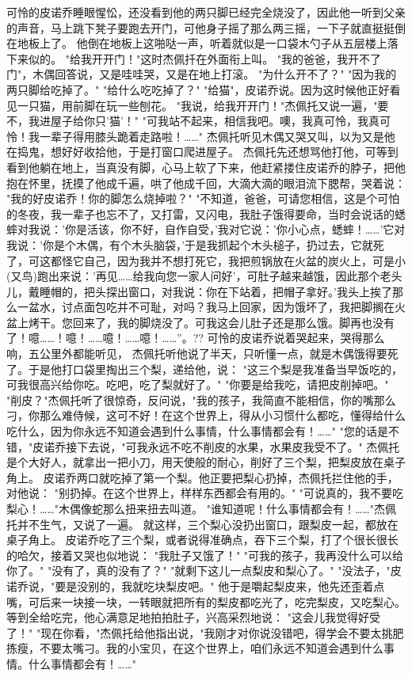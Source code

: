 \documentclass[12pt,UTF8]{ctexbook}
\begin{document}
可怜的皮诺乔睡眼惺忪，还没看到他的两只脚已经完全烧没了，因此他一听到父亲的声音，马上跳下凳子要跑去开门，可他身子摇了那么两三摇，一下子就直挺挺倒在地板上了。
他倒在地板上这啪哒一声，听着就似是一口袋木勺子从五层楼上落下来似的。
"给我开开门！"这时杰佩扦在外面衔上叫。
"我的爸爸，我开不了门"，木偶回答说，又是哇哇哭，又是在地上打滚。
"为什么开不了？"
"因为我的两只脚给吃掉了。"
"给什么吃吃掉了？"
"给猫"，皮诺乔说。因为这时候他正好看见一只猫，用前脚在玩一些刨花。
"我说，给我开开门！"杰佩托又说一遍，"要不，我进屋子给你只'猫'！"
"可我站不起来，相信我吧。噢，我真可怜，我真可怜！我一辈子得用膝头跪着走路啦！……"
杰佩托听见木偶又哭又叫，以为又是他在捣鬼，想好好收拾他，于是打窗口爬进屋子。
杰佩托先还想骂他打他，可等到看到他躺在地上，当真没有脚，心马上软了下来，他赶紧搂住皮诺乔的脖子，把他抱在怀里，抚摸了他成千遍，哄了他成千回，大滴大滴的眼泪流下腮帮，哭着说：
"我的好皮诺乔！你的脚怎么烧掉啦？"
"不知道，爸爸，可请您相信，这是个可怕的冬夜，我一辈子也忘不了，又打雷，又闪电，我肚子饿得要命，当时会说话的蟋蟀对我说：'你是活该，你不好，自作自受，'我对它说：'你小心点，蟋蟀！……'它对我说：'你是个木偶，有个木头脑袋，'于是我抓起个木头槌子，扔过去，它就死了，可这都怪它自己，因为我并不想打死它，我把煎锅放在火盆的炭火上，可是小(又鸟)跑出来说：'再见……给我向您一家人问好'，可肚子越来越饿，因此那个老头儿，戴睡帽的，把头探出窗口，对我说：你在下站着，把帽子拿好。'我头上挨了那么一盆水，讨点面包吃并不可耻，对吗？我马上回家，因为饿坏了，我把脚搁在火盆上烤干。您回来了，我的脚烧没了。可我这会儿肚子还是那么饿。脚再也没有了！噫……！噫！……噫！……噫！……”。??
可怜的皮诺乔说着哭起来，哭得那么响，五公里外都能听见，
杰佩托听他说了半天，只听懂一点，就是木偶饿得要死了。于是他打口袋里掏出三个梨，递给他，说：
"这三个梨是我准备当早饭吃的，可我很高兴给你吃。吃吧，吃了梨就好了。"
"你要是给我吃，请把皮削掉吧。"
"削皮？"杰佩托听了很惊奇，反问说，"我的孩子，我简直不能相信，你的嘴那么刁，你那么难侍候，这可不好！在这个世界上，得从小习惯什么都吃，懂得给什么吃什么，因为你永远不知道会遇到什么事情，什么事情都会有！……"
"您的话是不错，"皮诺乔接下去说，"可我永远不吃不削皮的水果，水果皮我受不了。"
杰佩托是个大好人，就拿出一把小刀，用天使般的耐心，削好了三个梨，把梨皮放在桌子角上。
皮诺乔两口就吃掉了第一个梨。他正要把梨心扔掉，杰佩托拦住他的手，对他说：
"别扔掉。在这个世界上，样样东西都会有用的。"
"可说真的，我不要吃梨心！……"木偶像蛇那么扭来扭去叫道。
"谁知道呢！什么事情都会有！……"杰佩托并不生气，又说了一遍。
就这样，三个梨心没扔出窗口，跟梨皮一起，都放在桌子角上。
皮诺乔吃了三个梨，或者说得准确点，吞下三个梨，打了个很长很长的哈欠，接着又哭也似地说：
"我肚子又饿了！"
"可我的孩子，我再没什么可以给你了。"
"没有了，真的没有了？"
"就剩下这儿一点梨皮和梨心了。"
"没法子，"皮诺乔说，"要是没别的，我就吃块梨皮吧。"
他于是嚼起梨皮来，他先还歪着点嘴，可后来一块接一块，一转眼就把所有的梨皮都吃光了，吃完梨皮，又吃梨心。等到全给吃完，他心满意足地拍拍肚子，兴高采烈地说：
"这会儿我觉得好受了！"
"现在你看，"杰佩托给他指出说，"我刚才对你说没错吧，得学会不要太挑肥拣瘦，不要太嘴刁。我的小宝贝，在这个世界上，咱们永远不知道会遇到什么事情。什么事情都会有！……"
\end{document}
